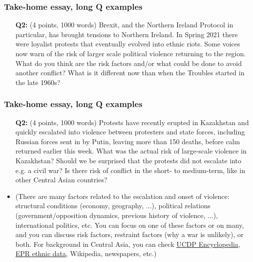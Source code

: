 \documentclass[aspectratio=43]{beamer}
\begin{document}
\begin{frame}
\frametitle{Take-home essay, long Q examples}
\centering

\begin{itemize}
  \item[\textbf{Q2:}] (4 points, 1000 words) Brexit, and the Northern Ireland Protocol in particular, has brought tensions to Northern Ireland. In Spring 2021 there were loyalist protests that eventually evolved into ethnic riots. Some voices now warn of the risk of larger scale political violence returning to the region. What do you think are the risk factors and/or what could be done to avoid another conflict? What is it different now than when the Troubles started in the late 1960s?
\end{itemize}

\end{frame}

\begin{frame}
\frametitle{Take-home essay, long Q examples}
\centering

\begin{itemize}\small
  \item[\textbf{Q2:}] (4 points, 1000 words) Protests have recently erupted in Kazakhstan and quickly escalated into violence between protesters and state forces, including Russian forces sent in by Putin, leaving more than 150 deaths, before calm returned earlier this week. What was the actual risk of large-scale violence in Kazakhstan? Should we be surprised that the protests did not escalate into e.g. a civil war? Is there risk of conflict in the short- to medium-term, like in other Central Asian countries?
\end{itemize}


\begin{itemize}
  \item ({\footnotesize There are many factors related to the escalation and onset of violence: structural conditions (economy, geography, ...), political relations (government/opposition dynamics, previous history of violence, ...), international politics, etc. You can focus on one of these factors or on many, and you can discuss risk factors, restraint factors (why a war is unlikely), or both. For background in Central Asia, you can check  \href{https://ucdp.uu.se/}{UCDP Encyclopedia}, \href{https://growup.ethz.ch/atlas/}{EPR ethnic data}, Wikipedia, newspapers, etc.})
\end{itemize}

\end{frame}

  
\end{document}
